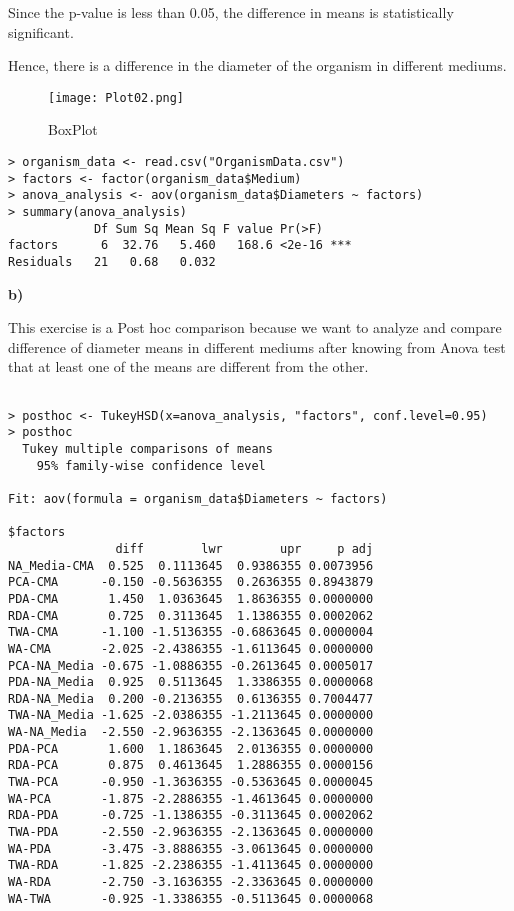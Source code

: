 \documentclass[12pt,letterpaper]{article}
\begin{document}
Since the p-value is less than 0.05, the difference in means is statistically significant.

Hence, there is a difference in the diameter of the organism in different mediums.

\begin{figure}[!h]
   \centering
    \texttt{[image: Plot02.png]}
    \caption{BoxPlot}
    \end{figure}

\begin{lstlisting}[label=R Code,caption=Q2(a) R Code Output]
> organism_data <- read.csv("OrganismData.csv")
> factors <- factor(organism_data$Medium)
> anova_analysis <- aov(organism_data$Diameters ~ factors)
> summary(anova_analysis)
            Df Sum Sq Mean Sq F value Pr(>F)    
factors      6  32.76   5.460   168.6 <2e-16 ***
Residuals   21   0.68   0.032                   
\end{lstlisting}

\textbf{{b)} } 

This exercise is a Post hoc comparison because we want to analyze and compare difference of diameter means in different mediums after knowing from Anova test that at least one of the means are different from the other. 

\begin{lstlisting}[label=R Code,caption=Q2(b) R Code Output]
      
> posthoc <- TukeyHSD(x=anova_analysis, "factors", conf.level=0.95)
> posthoc
  Tukey multiple comparisons of means
    95% family-wise confidence level

Fit: aov(formula = organism_data$Diameters ~ factors)

$factors
               diff        lwr        upr     p adj
NA_Media-CMA  0.525  0.1113645  0.9386355 0.0073956
PCA-CMA      -0.150 -0.5636355  0.2636355 0.8943879
PDA-CMA       1.450  1.0363645  1.8636355 0.0000000
RDA-CMA       0.725  0.3113645  1.1386355 0.0002062
TWA-CMA      -1.100 -1.5136355 -0.6863645 0.0000004
WA-CMA       -2.025 -2.4386355 -1.6113645 0.0000000
PCA-NA_Media -0.675 -1.0886355 -0.2613645 0.0005017
PDA-NA_Media  0.925  0.5113645  1.3386355 0.0000068
RDA-NA_Media  0.200 -0.2136355  0.6136355 0.7004477
TWA-NA_Media -1.625 -2.0386355 -1.2113645 0.0000000
WA-NA_Media  -2.550 -2.9636355 -2.1363645 0.0000000
PDA-PCA       1.600  1.1863645  2.0136355 0.0000000
RDA-PCA       0.875  0.4613645  1.2886355 0.0000156
TWA-PCA      -0.950 -1.3636355 -0.5363645 0.0000045
WA-PCA       -1.875 -2.2886355 -1.4613645 0.0000000
RDA-PDA      -0.725 -1.1386355 -0.3113645 0.0002062
TWA-PDA      -2.550 -2.9636355 -2.1363645 0.0000000
WA-PDA       -3.475 -3.8886355 -3.0613645 0.0000000
TWA-RDA      -1.825 -2.2386355 -1.4113645 0.0000000
WA-RDA       -2.750 -3.1636355 -2.3363645 0.0000000
WA-TWA       -0.925 -1.3386355 -0.5113645 0.0000068
\end{lstlisting}
\end{document}
